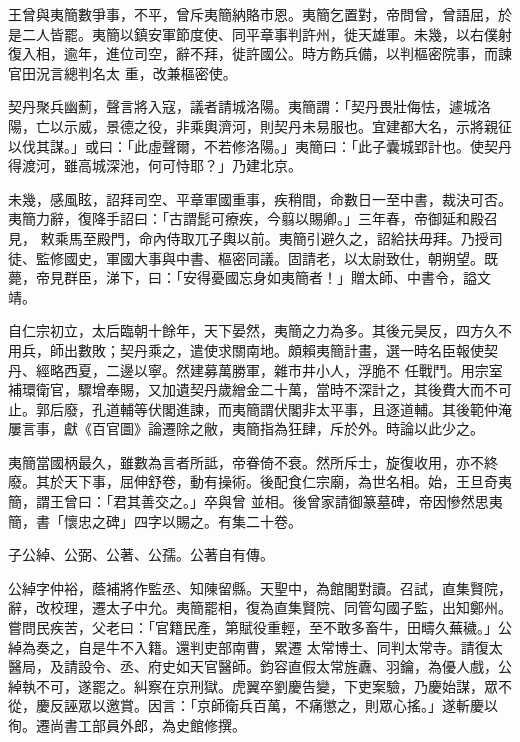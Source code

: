 \begin{pinyinscope}
 王曾與夷簡數爭事，不平，曾斥夷簡納賂市恩。夷簡乞置對，帝問曾，曾語屈，於是二人皆罷。夷簡以鎮安軍節度使、同平章事判許州，徙天雄軍。未幾，以右僕射復入相，逾年，進位司空，辭不拜，徙許國公。時方飭兵備，以判樞密院事，而諫官田況言總判名太
 重，改兼樞密使。



 契丹聚兵幽薊，聲言將入寇，議者請城洛陽。夷簡謂：「契丹畏壯侮怯，遽城洛陽，亡以示威，景德之役，非乘輿濟河，則契丹未易服也。宜建都大名，示將親征以伐其謀。」或曰：「此虛聲爾，不若修洛陽。」夷簡曰：「此子囊城郢計也。使契丹得渡河，雖高城深池，何可恃耶？」乃建北京。



 未幾，感風眩，詔拜司空、平章軍國重事，疾稍間，命數日一至中書，裁決可否。夷簡力辭，復降手詔曰：「古謂髭可療疾，今翦以賜卿。」三年春，帝御延和殿召見，
 敕乘馬至殿門，命內侍取兀子輿以前。夷簡引避久之，詔給扶毋拜。乃授司徒、監修國史，軍國大事與中書、樞密同議。固請老，以太尉致仕，朝朔望。既薨，帝見群臣，涕下，曰：「安得憂國忘身如夷簡者！」贈太師、中書令，謚文靖。



 自仁宗初立，太后臨朝十餘年，天下晏然，夷簡之力為多。其後元昊反，四方久不用兵，師出數敗；契丹乘之，遣使求關南地。頗賴夷簡計畫，選一時名臣報使契丹、經略西夏，二邊以寧。然建募萬勝軍，雜市井小人，浮脆不
 任戰鬥。用宗室補環衛官，驟增奉賜，又加遺契丹歲繒金二十萬，當時不深計之，其後費大而不可止。郭后廢，孔道輔等伏閣進諫，而夷簡謂伏閣非太平事，且逐道輔。其後範仲淹屢言事，獻《百官圖》論遷除之敝，夷簡指為狂肆，斥於外。時論以此少之。



 夷簡當國柄最久，雖數為言者所詆，帝眷倚不衰。然所斥士，旋復收用，亦不終廢。其於天下事，屈伸舒卷，動有操術。後配食仁宗廟，為世名相。始，王旦奇夷簡，謂王曾曰：「君其善交之。」卒與曾
 並相。後曾家請御篆墓碑，帝因慘然思夷簡，書「懷忠之碑」四字以賜之。有集二十卷。



 子公綽、公弼、公著、公孺。公著自有傳。



 公綽字仲裕，蔭補將作監丞、知陳留縣。天聖中，為館閣對讀。召試，直集賢院，辭，改校理，遷太子中允。夷簡罷相，復為直集賢院、同管勾國子監，出知鄭州。嘗問民疾苦，父老曰：「官籍民產，第賦役重輕，至不敢多畜牛，田疇久蕪穢。」公綽為奏之，自是牛不入籍。還判吏部南曹，累遷
 太常博士、同判太常寺。請復太醫局，及請設令、丞、府史如天官醫師。鈞容直假太常旌纛、羽鑰，為優人戲，公綽執不可，遂罷之。糾察在京刑獄。虎翼卒劉慶告變，下吏案驗，乃慶始謀，眾不從，慶反誣眾以邀賞。因言：「京師衛兵百萬，不痛懲之，則眾心搖。」遂斬慶以徇。遷尚書工部員外郎，為史館修撰。




\end{pinyinscope}
